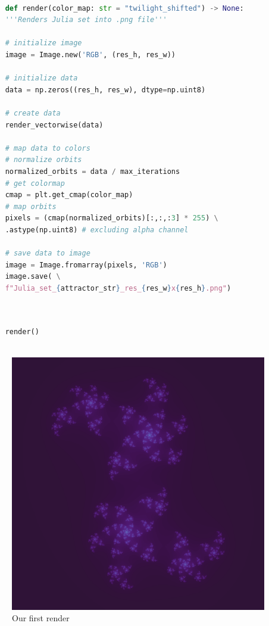 \documentclass{article}
\begin{document}
\begin{lstlisting}[language=Python, caption=Final PNG function]
	
	def render(color_map: str = "twilight_shifted") -> None:
	'''Renders Julia set into .png file'''
	
	# initialize image
	image = Image.new('RGB', (res_h, res_w))
	
	# initialize data
	data = np.zeros((res_h, res_w), dtype=np.uint8)
	
	# create data
	render_vectorwise(data)
	
	# map data to colors
	# normalize orbits
	normalized_orbits = data / max_iterations
	# get colormap
	cmap = plt.get_cmap(color_map)
	# map orbits
	pixels = (cmap(normalized_orbits)[:,:,:3] * 255) \
	.astype(np.uint8) # excluding alpha channel
	
	# save data to image
	image = Image.fromarray(pixels, 'RGB')
	image.save( \
	f"Julia_set_{attractor_str}_res_{res_w}x{res_h}.png")
	
\end{lstlisting}


\begin{lstlisting}[language=Python, caption=Execution]
	
	render()
	
\end{lstlisting}

\begin{figure}[H]
	\includegraphics[width=\linewidth]{Utils/article_dependencies/Implementation_chapter/render_1.png}
	\caption{\footnotesize Our first render}
\end{figure}
\end{document}
